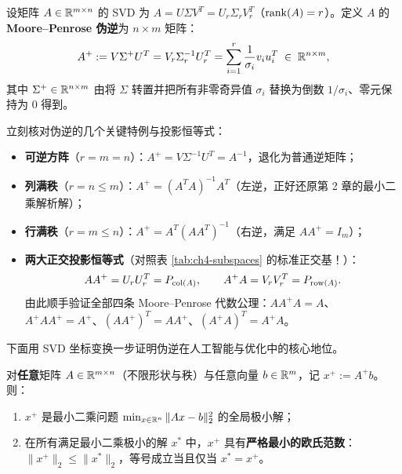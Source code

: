 \begin{defBox}
\begin{definition}
\label{def:ch4-pinv}
设矩阵 $A \in \mathbb{R}^{m\times n}$ 的 SVD 为 $A = U\Sigma V^T = U_r \Sigma_r V_r^T$（$\operatorname{rank}(A) = r$）。定义 $A$ 的 \textbf{Moore--Penrose 伪逆}为 $n\times m$ 矩阵：
\begin{equation}
  A^+ := V \Sigma^+ U^T = V_r \Sigma_r^{-1} U_r^T = \sum_{i=1}^r \frac{1}{\sigma_i} v_i u_i^T \;\in\; \mathbb{R}^{n\times m}, \label{eq:ch4-pinv}
\end{equation}
其中 $\Sigma^+ \in \mathbb{R}^{n\times m}$ 由将 $\Sigma$ 转置并把所有非零奇异值 $\sigma_i$ 替换为倒数 $1/\sigma_i$、零元保持为 $0$ 得到。
\end{definition}
\end{defBox}

立刻核对伪逆的几个关键特例与投影恒等式：
\begin{itemize}
  \item \textbf{可逆方阵}（$r = m = n$）：$A^+ = V \Sigma^{-1} U^T = A^{-1}$，退化为普通逆矩阵；
  \item \textbf{列满秩}（$r = n \le m$）：$A^+ = (A^T A)^{-1} A^T$（左逆，正好还原第 2 章的最小二乘解析解）；
  \item \textbf{行满秩}（$r = m \le n$）：$A^+ = A^T (A A^T)^{-1}$（右逆，满足 $A A^+ = I_m$）；
  \item \textbf{两大正交投影恒等式}（对照表 \ref{tab:ch4-subspaces} 的标准正交基！）：
  \begin{equation}
    A A^+ = U_r U_r^T = P_{\operatorname{col}(A)}, \qquad A^+ A = V_r V_r^T = P_{\operatorname{row}(A)}. \label{eq:ch4-pinv-proj}
  \end{equation}
  由此顺手验证全部四条 Moore--Penrose 代数公理：$A A^+ A = A$、$A^+ A A^+ = A^+$、$(AA^+)^T = AA^+$、$(A^+A)^T = A^+A$。
\end{itemize}

下面用 SVD 坐标变换一步证明伪逆在人工智能与优化中的核心地位。

\begin{thmBox}
\begin{theorem}[伪逆给出最小二乘集合中的唯一最小范数解]
\label{thm:ch4-min-norm}
对\textbf{任意}矩阵 $A \in \mathbb{R}^{m\times n}$（不限形状与秩）与任意向量 $b \in \mathbb{R}^m$，记 $x^+ := A^+ b$。则：
\begin{enumerate}
  \item $x^+$ 是最小二乘问题 $\min_{x\in\mathbb{R}^n} \|Ax - b\|_2^2$ 的全局极小解；
  \item 在所有满足最小二乘极小的解 $x^*$ 中，$x^+$ 具有\textbf{严格最小的欧氏范数}：$\|x^+\|_2 \le \|x^*\|_2$，等号成立当且仅当 $x^* = x^+$。
\end{enumerate}
\end{theorem}
\end{thmBox}

